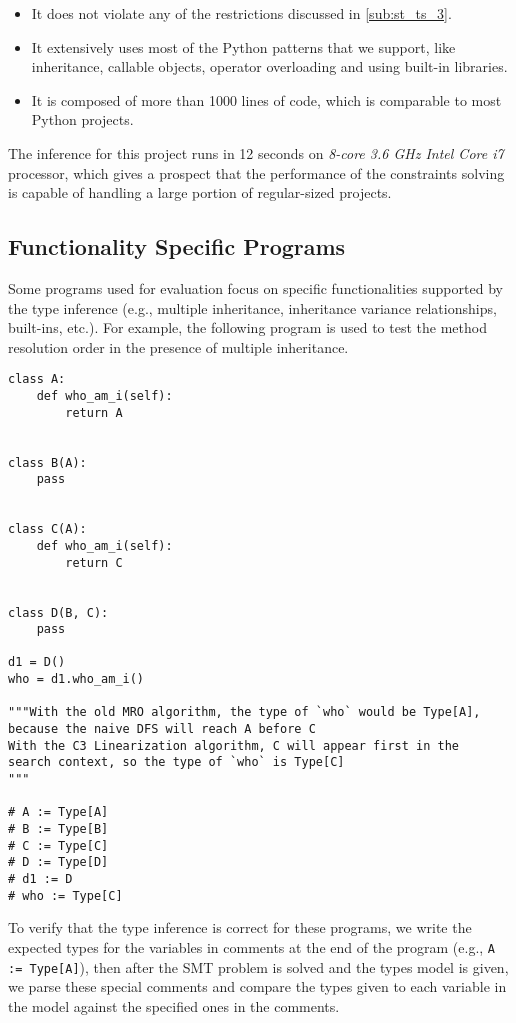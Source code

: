\begin{itemize}
	\item It does not violate any of the restrictions discussed in \ref{sub:st_ts_3}.
	\item It extensively uses most of the Python patterns that we support, like inheritance, callable objects, operator overloading and using built-in libraries.
	\item It is composed of more than 1000 lines of code, which is comparable to most Python projects.
\end{itemize}
The inference for this project runs in 12 seconds on \textit{8-core 3.6 GHz Intel Core i7} processor, which gives a prospect that the performance of the constraints solving is capable of handling a large portion of regular-sized projects.

\subsection{Functionality Specific Programs}
Some programs used for evaluation focus on specific functionalities supported by the type inference (e.g., multiple inheritance, inheritance variance relationships, built-ins, etc.). For example, the following program is used to test the method resolution order in the presence of multiple inheritance.
\begin{lstlisting}
class A:
	def who_am_i(self):
		return A


class B(A):
	pass


class C(A):
	def who_am_i(self):
		return C


class D(B, C):
	pass

d1 = D()
who = d1.who_am_i()

"""With the old MRO algorithm, the type of `who` would be Type[A],
because the naive DFS will reach A before C
With the C3 Linearization algorithm, C will appear first in the
search context, so the type of `who` is Type[C]
"""

# A := Type[A]
# B := Type[B]
# C := Type[C]
# D := Type[D]
# d1 := D
# who := Type[C]
\end{lstlisting}

To verify that the type inference is correct for these programs, we write the expected types for the variables in comments at the end of the program (e.g., \lstinline|A := Type[A]|), then after the SMT problem is solved and the types model is given, we parse these special comments and compare the types given to each variable in the model against the specified ones in the comments.
